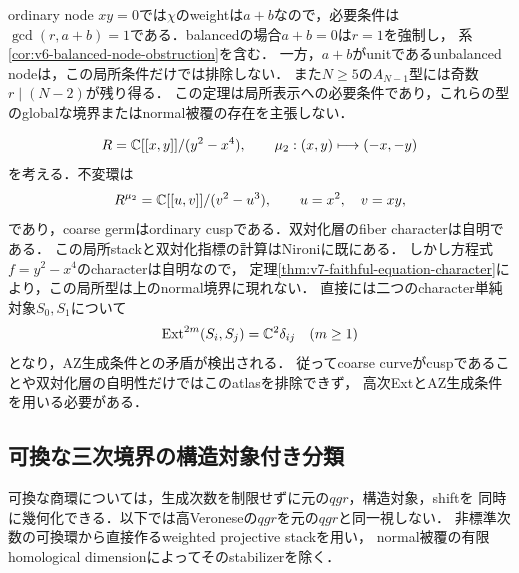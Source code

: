 \documentclass[11pt,a4paper]{ltjsarticle}
\begin{document}
\begin{remark}
ordinary node $xy=0$では$\chi$のweightは$a+b$なので，必要条件は
$\gcd(r,a+b)=1$である．balancedの場合$a+b=0$は$r=1$を強制し，
系\ref{cor:v6-balanced-node-obstruction}を含む．
一方，$a+b$がunitであるunbalanced nodeは，この局所条件だけでは排除しない．
また$N\geq5$の$A_{N-1}$型には奇数$r\mid(N-2)$が残り得る．
この定理は局所表示への必要条件であり，これらの型のglobalな境界またはnormal被覆の存在を主張しない．
\end{remark}

\begin{example}\label{ex:v7-tacnode-obstruction}
\[
 R=\mathbb C[[x,y]]/(y^2-x^4),\qquad
 \mu_2:(x,y)\longmapsto(-x,-y)
\]
を考える．不変環は
\[
 R^{\mu_2}=\mathbb C[[u,v]]/(v^2-u^3),\qquad u=x^2,\quad v=xy,
\]
であり，coarse germはordinary cuspである．双対化層のfiber characterは自明である．
この局所stackと双対化指標の計算はNironi\cite[Example 3.7]{NironiDuality}に既にある．
しかし方程式$f=y^2-x^4$のcharacterは自明なので，
定理\ref{thm:v7-faithful-equation-character}により，この局所型は上のnormal境界に現れない．
直接には二つのcharacter単純対象$S_0,S_1$について
\[
 \operatorname{Ext}^{2m}(S_i,S_j)=\mathbb C^2\delta_{ij}\quad(m\geq1)
\]
となり，AZ生成条件との矛盾が検出される．
従ってcoarse curveがcuspであることや双対化層の自明性だけではこのatlasを排除できず，
高次ExtとAZ生成条件を用いる必要がある．
\end{example}

\subsection{可換な三次境界の構造対象付き分類}
\label{subsec:v7-commutative-boundary}

可換な商環については，生成次数を制限せずに元の$qgr$，構造対象，shiftを
同時に幾何化できる．以下では高Veroneseの$qgr$を元の$qgr$と同一視しない．
非標準次数の可換環から直接作るweighted projective stackを用い，
normal被覆の有限homological dimensionによってそのstabilizerを除く．
\end{document}

